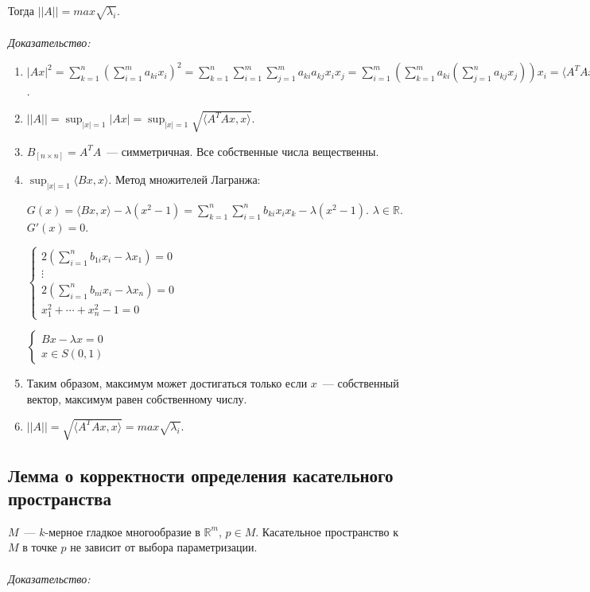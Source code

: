 \documentclass[paper=a4, fontsize=11pt]{article}
\begin{document}
Тогда $||A|| = max \sqrt{\lambda_i}$.
\\\\
\emph{Доказательство:}
\begin{enumerate}
    \item $|Ax|^2 = \sum_{k=1}^n (\sum_{i=1}^m a_{ki}x_i)^2 = \sum_{k=1}^n \sum_{i=1}^m \sum_{j=1}^m a_{ki} a_{kj} x_i x_j =
    \sum_{i=1}^m (\sum_{k=1}^m a_{ki} (\sum_{j=1}^n a_{kj} x_j)) x_i = \langle A^TAx,x \rangle$.
    \item $||A|| = \sup_{|x|=1} |Ax| = \sup_{|x|=1} \sqrt{\langle A^TAx,x \rangle}$.
    \item $B_{[n \times n]} = A^TA$~--- симметричная. Все собственные числа вещественны.
    \item $\sup_{|x|=1} \langle Bx,x \rangle$. Метод множителей Лагранжа:

    $G(x) = \langle Bx,x \rangle - \lambda (x^2-1) = \sum_{k=1}^n \sum_{i=1}^n b_{ki}x_ix_k - \lambda(x^2-1)$.
    $\lambda \in \mathds{R}$. $G'(x) = 0$.

    $\begin{cases}
        2(\sum_{i=1}^n b_{1i}x_i - \lambda x_1) = 0 \\
        \vdots\\
        2(\sum_{i=1}^n b_{ni}x_i - \lambda x_n) = 0 \\
        x_1^2 + \cdots + x_n^2 - 1 = 0
    \end{cases}$

    $\begin{cases}
        Bx - \lambda x = 0\\
        x \in S(0,1)
    \end{cases}$
    \item Таким образом, максимум может достигаться только если $x$~--- собственный вектор, максимум равен собственному числу.
    \item $||A|| = \sqrt{\langle A^TAx,x \rangle} = max \sqrt{\lambda_i}$.
\end{enumerate}

\subsection{Лемма о корректности определения касательного пространства}
$M$~--- $k$-мерное гладкое многообразие в $\mathds{R}^m$, $p \in M$. Касательное пространство к $M$ в точке $p$
не зависит от выбора параметризации.
\\\\
\emph{Доказательство:}
\end{document}
